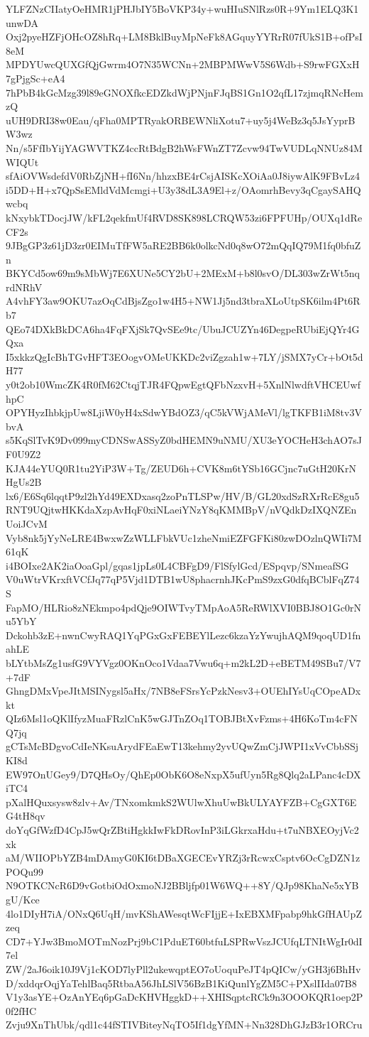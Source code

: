 YLFZNzCIIatyOeHMR1jPHJbIY5BoVKP34y+wuHIuSNlRzs0R+9Ym1ELQ3K1unwDA
Oxj2pyeHZFjOHcOZ8hRq+LM8BklBuyMpNeFk8AGquyYYRrR07fUkS1B+ofPsI8eM
MPDYUwcQUXGfQjGwrm4O7N35WCNn+2MBPMWwV5S6Wdb+S9rwFGXxH7gPjgSc+eA4
7hPbB4kGcMzg39l89eGNOXfkcEDZkdWjPNjnFJqBS1Gn1O2qfL17zjmqRNcHemzQ
uUH9DRI38w0Eau/qFha0MPTRyakORBEWNliXotu7+uy5j4WeBz3q5JsYyprBW3wz
Nn/s5FfIbYijYAGWVTKZ4ccRtBdgB2hWsFWnZT7Zcvw94TwVUDLqNNUz84MWIQUt
sfAiOVWsdefdV0RbZjNH+fI6Nn/hhzxBE4rCsjAISKcXOiAa0J8iywAlK9FBvLz4
i5DD+H+x7QpSsEMldVdMcmgi+U3y38dL3A9El+z/OAomrhBevy3qCgaySAHQwcbq
kNxybkTDocjJW/kFL2qekfmUf4RVD8SK898LCRQW53zi6FPFUHp/OUXq1dReCF2s
9JBgGP3z61jD3zr0EIMuTfFW5aRE2BB6k0olkcNd0q8wO72mQqIQ79M1fq0bfuZn
BKYCd5ow69m9sMbWj7E6XUNe5CY2bU+2MExM+b8l0svO/DL303wZrWt5nqrdNRhV
A4vhFY3aw9OKU7azOqCdBjsZgo1w4H5+NW1Jj5nd3tbraXLoUtpSK6ilm4Pt6Rb7
QEo74DXkBkDCA6ha4FqFXjSk7QvSEe9tc/UbuJCUZYn46DegpeRUbiEjQYr4GQxa
I5xkkzQgIcBhTGvHFT3EOogvOMeUKKDc2viZgzah1w+7LY/jSMX7yCr+bOt5dH77
y0t2ob10WmcZK4R0fM62CtqjTJR4FQpwEgtQFbNzxvH+5XnlNlwdftVHCEUwfhpC
OPYHyzIhbkjpUw8LjiW0yH4xSdwYBdOZ3/qC5kVWjAMeVl/lgTKFB1iM8tv3VbvA
s5KqSlTvK9Dv099myCDNSwASSyZ0bdHEMN9uNMU/XU3eYOCHeH3chAO7sJF0U9Z2
KJA44eYUQ0R1tu2YiP3W+Tg/ZEUD6h+CVK8m6tYSb16GCjnc7uGtH20KrNHgUs2B
lx6/E6Sq6lqqtP9zl2hYd49EXDxasq2zoPnTLSPw/HV/B/GL20xdSzRXrRcE8gu5
RNT9UQjtwHKKdaXzpAvHqF0xiNLaeiYNzY8qKMMBpV/nVQdkDzIXQNZEnUoiJCvM
Vyb8nk5jYyNeLRE4BwxwZzWLLFbkVUc1zheNmiEZFGFKi80zwDOzlnQWIi7M61qK
i4BOIxe2AK2iaOoaGpl/gqas1jpLs0L4CBFgD9/FlSfylGcd/ESpqvp/SNmeafSG
V0uWtrVKrxftVCfJq77qP5Vjd1DTB1wU8phacrnhJKcPmS9zxG0dfqBCblFqZ74S
FapMO/HLRio8zNEkmpo4pdQje9OIWTvyTMpAoA5ReRWlXVI0BBJ8O1Gc0rNu5YbY
Dckohb3zE+nwnCwyRAQ1YqPGxGxFEBEYlLezc6kzaYzYwujhAQM9qoqUD1fnahLE
bLYtbMsZg1usfG9VYVgz0OKnOco1Vdaa7Vwu6q+m2kL2D+eBETM49SBu7/V7+7dF
GhngDMxVpeJItMSINygsl5aHx/7NB8eFSrsYcPzkNesv3+OUEhIYsUqCOpeADxkt
QIz6Msl1oQKlIfyzMuaFRzlCnK5wGJTnZOq1TOBJBtXvFzms+4H6KoTm4cFNQ7jq
gCTsMcBDgvoCdIeNKsuArydFEaEwT13kehmy2yvUQwZmCjJWPI1xVvCbbSSjKI8d
EW97OnUGey9/D7QHsOy/QhEp0ObK6O8eNxpX5ufUyn5Rg8Qlq2aLPanc4cDXiTC4
pXalHQuxsysw8zlv+Av/TNxomkmkS2WUlwXhuUwBkULYAYFZB+CgGXT6EG4tH8qv
doYqGfWzfD4CpJ5wQrZBtiHgkkIwFkDRovInP3iLGkrxaHdu+t7uNBXEOyjVc2xk
aM/WIIOPbYZB4mDAmyG0KI6tDBaXGECEvYRZj3rRcwxCsptv6OcCgDZN1zPOQu99
N9OTKCNcR6D9vGotbiOdOxmoNJ2BBljfp01W6WQ++8Y/QJp98KhaNe5xYBgU/Kce
4lo1DIyH7iA/ONxQ6UqH/mvKShAWesqtWcFIjjE+IxEBXMFpabp9hkGfHAUpZzeq
CD7+YJw3BmoMOTmNozPrj9bC1PduET60btfuLSPRwVszJCUfqLTNItWgIr0dI7el
ZW/2aJ6oik10J9Vj1cKOD7lyPll2ukewqptEO7oUoquPeJT4pQICw/yGH3j6BhHv
D/xddqrOqjYaTehlBaq5RtbaA56JhLSlV56BzB1KiQunlYgZM5C+PXslIIda07B8
V1y3asYE+OzAnYEq6pGaDcKHVHggkD++XHISqptcRCk9n3OOOKQR1oep2P0f2fHC
Zvju9XnThUbk/qdl1c44fSTIVBiteyNqTO5If1dgYfMN+Nn328DhGJzB3r1ORCru
